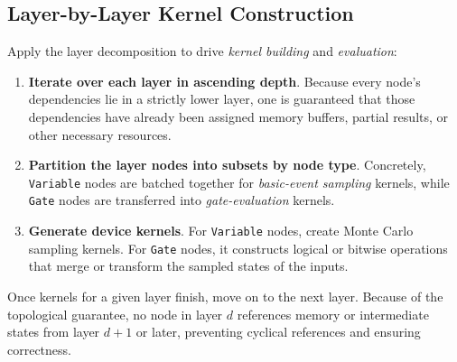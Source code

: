\subsection{Layer-by-Layer Kernel Construction}

Apply the layer decomposition to drive \emph{kernel building} and \emph{evaluation}:

\begin{enumerate}
    \item \textbf{Iterate over each layer in ascending depth}.  Because every node’s dependencies lie in a strictly lower layer, one is guaranteed that those dependencies have already been assigned memory buffers, partial results, or other necessary resources.
    \item \textbf{Partition the layer nodes into subsets by node type}.  Concretely, \texttt{Variable} nodes are batched together for \emph{basic-event sampling} kernels, while \texttt{Gate} nodes are transferred into \emph{gate-evaluation} kernels.  
    \item \textbf{Generate device kernels}.  For \texttt{Variable} nodes, create Monte Carlo sampling kernels. For \texttt{Gate} nodes, it constructs logical or bitwise operations that merge or transform the sampled states of the inputs.  
\end{enumerate}

Once kernels for a given layer finish, move on to the next layer. Because of the topological guarantee, no node in layer \(d\) references memory or intermediate states from layer \(d\!+\!1\) or later, preventing cyclical references and ensuring correctness.